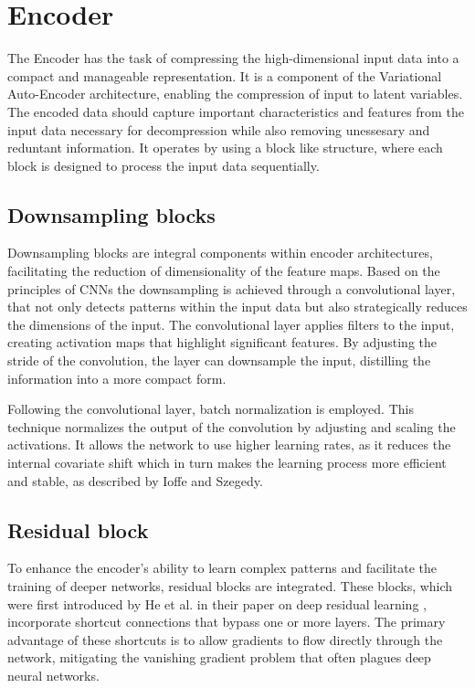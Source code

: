 \section{Encoder}
The Encoder has the task of compressing the high-dimensional input data into a compact and manageable representation. It is a component of the Variational Auto-Encoder architecture, enabling the compression of input to latent variables.
The encoded data should capture important characteristics and features from the input data necessary for decompression while also removing unessesary and reduntant information. 
It operates by using a block like structure, where each block is designed to process the input data sequentially.

\subsection{Downsampling blocks}
Downsampling blocks are integral components within encoder architectures, facilitating the reduction of dimensionality of the feature maps. Based on the principles of CNNs the downsampling is achieved through a convolutional layer, that not only detects patterns within the input data but also strategically reduces the dimensions of the input.
The convolutional layer applies filters to the input, creating activation maps that highlight significant features. By adjusting the stride of the convolution, the layer can downsample the input, distilling the information into a more compact form. 

Following the convolutional layer, batch normalization is employed. This technique normalizes the output of the convolution by adjusting and scaling the activations. It allows the network to use higher learning rates, as it reduces the internal covariate shift which in turn makes the learning process more efficient and stable, as described by Ioffe and Szegedy\cite{batchnorm}.

\subsection{Residual block}
To enhance the encoder's ability to learn complex patterns and facilitate the training of deeper networks, residual blocks are integrated. These blocks, which were first introduced by He et al. in their paper on deep residual learning \cite{ResLearn}, incorporate shortcut connections that bypass one or more layers. 
The primary advantage of these shortcuts is to allow gradients to flow directly through the network, mitigating the vanishing gradient problem that often plagues deep neural networks. 

